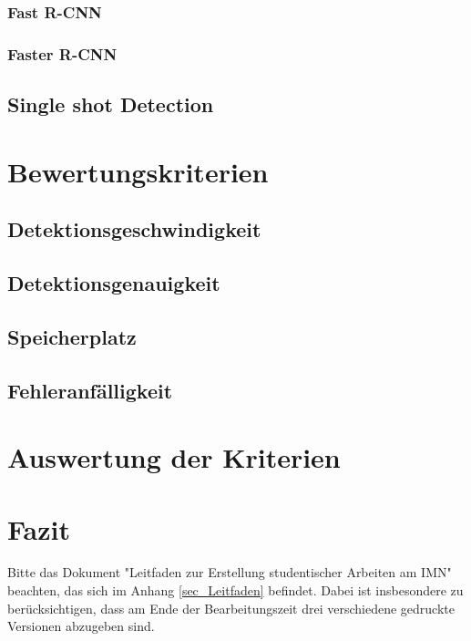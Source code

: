 \documentclass[12pt,
titlepage,
a4paper,
oneside,     %
openany,     %
listof=totoc,  %
numbers = noenddot, %
bibliography=totoc,    %
headsepline, %
]{scrbook} %
\begin{document}
\subsection{Fast R-CNN}
\label{subsec_frcnn}

\subsection{Faster R-CNN}
\label{subsec_ffrcnn}

\section{Single shot Detection}
\label{sec_ssd}


\chapter{Bewertungskriterien}
\label{cha:bewertungskriterien} 

\section{Detektionsgeschwindigkeit}
\label{sec_detgeschw}

\section{Detektionsgenauigkeit}
\label{sec_detgenau}

\section{Speicherplatz}
\label{sec_speicher}

\section{Fehleranfälligkeit}
\label{sec_fehler}


\chapter{Auswertung der Kriterien}
\label{cha:auswertung}


\chapter{Fazit}
\label{cha:fazit}
Bitte das Dokument "Leitfaden zur Erstellung studentischer Arbeiten am IMN" beachten, das sich im Anhang \ref{sec_Leitfaden} befindet. Dabei ist insbesondere zu berücksichtigen, dass am Ende der Bearbeitungszeit drei verschiedene gedruckte Versionen abzugeben sind.
\end{document}
